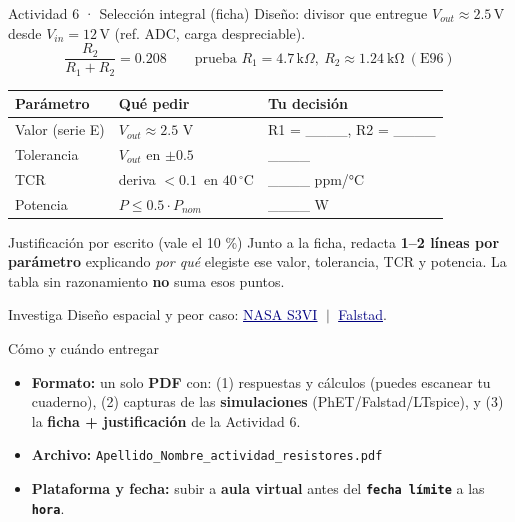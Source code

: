 \documentclass[aspectratio=169]{beamer}
\newcommand{\enlace}[2]{\href{#1}{\textcolor{navy}{\underline{#2}}}}
\begin{document}
\begin{frame}{Actividad 6 · Selección integral (ficha)}
  Diseño: divisor que entregue $V_{out}\approx 2.5\,\text{V}$ desde $V_{in}=12\,\text{V}$ (ref. ADC, carga despreciable).
  \[
    \frac{R_2}{R_1+R_2}=0.208 \qquad \text{prueba } R_1=4.7\,\text{k}\Omega,\ R_2\approx \SI{1.24}{\kilo\ohm}\ (\text{E96})
  \]
  \begin{table}
    \small
    \begin{tabular}{lll}
      \toprule
      Parámetro & Qué pedir & Tu decisión \\
      \midrule
      Valor (serie E) & $V_{out}\approx 2.5$ V & R1 = \_\_\_\_, R2 = \_\_\_\_ \\
      Tolerancia & $V_{out}$ en $\pm0.5$\,\text{\%} & \_\_\_\_\,\text{\%} \\
      TCR & deriva $<0.1$\,\text{\%} en $40\,^\circ\text{C}$ & \_\_\_\_ ppm/°C \\
      Potencia & $P\le 0.5\cdot P_{nom}$ & \_\_\_\_ W \\
      \bottomrule
    \end{tabular}
  \end{table}
  \pause
  \begin{block}{Justificación por escrito (vale el 10 \%)}
    Junto a la ficha, redacta \textbf{1–2 líneas por parámetro} explicando \emph{por
    qué} elegiste ese valor, tolerancia, TCR y potencia. La tabla sin razonamiento
    \textbf{no} suma esos puntos.
  \end{block}
  \pause
  \begin{block}{Investiga}
    \small
    Diseño espacial y peor caso: \enlace{https://s3vi.ndc.nasa.gov/ssri-kb/static/resources/electronic-circuit-design-and-analysis-for-space-applications.pdf}{NASA S3VI}
    $\;|\;$ \enlace{https://www.falstad.com/circuit/}{Falstad}.
  \end{block}
\end{frame}

\begin{frame}{Cómo y cuándo entregar}
  \begin{itemize}
    \item \textbf{Formato:} un solo \textbf{PDF} con: (1) respuestas y cálculos
      (puedes escanear tu cuaderno), (2) capturas de las \textbf{simulaciones}
      (PhET/Falstad/LTspice), y (3) la \textbf{ficha + justificación} de la Actividad 6.
    \item \textbf{Archivo:} \texttt{Apellido\_Nombre\_actividad\_resistores.pdf}
    \item \textbf{Plataforma y fecha:} subir a \textbf{aula virtual} antes del
      \textbf{\texttt{fecha límite}} a las \textbf{\texttt{hora}}.
  \end{itemize}
\end{frame}
\end{document}
